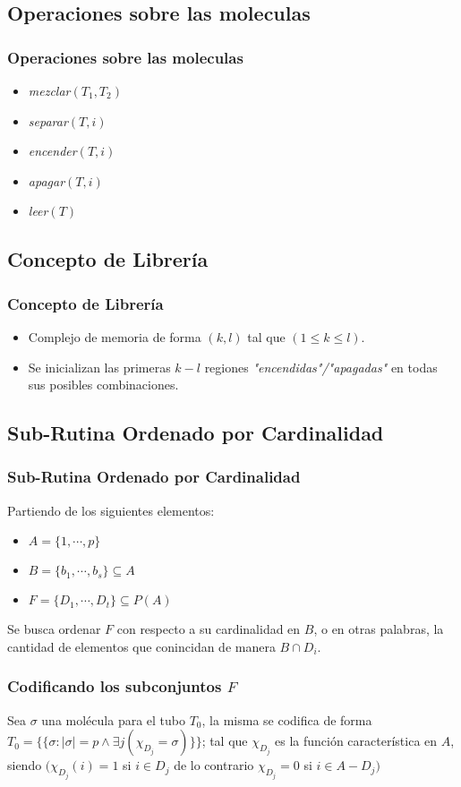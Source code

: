 \documentclass[12pt]{beamer}
\begin{document}
 \begin{frame}
     \subsection{Operaciones sobre las moleculas}
     \frametitle{Operaciones sobre las moleculas}
     \begin{itemize}
        \item \emph{mezclar}$(T_1,T_2)$
        \item \emph{separar}$(T, i)$
        \item \emph{encender}$(T, i)$
        \item \emph{apagar}$(T, i)$
        \item \emph{leer}$(T)$
     \end{itemize}
 \end{frame}
 \begin{frame}
     \subsection{Concepto de Librería}
     \frametitle{Concepto de Librería}
     \begin{itemize}
         \item Complejo de memoria de forma $(k,l)$ tal que  $(1 \leq k \leq l)$.
         \item Se inicializan las primeras $k - l$ regiones \emph{"encendidas"/"apagadas"} en todas sus posibles combinaciones.
     \end{itemize}
 \end{frame}
 \begin{frame}
     \subsection{Sub-Rutina Ordenado por Cardinalidad}
     \frametitle{Sub-Rutina Ordenado por Cardinalidad}
     Partiendo de los siguientes elementos:
     \begin{itemize}
        \item $A = \{1,\cdots,p\}$
        \item $B = \{b_1,\cdots,b_s\} \subseteq A$ 
        \item $F = \{D_1,\cdots,D_t\} \subseteq P(A)$ 
    \end{itemize}
    Se busca ordenar $F$ con respecto a su cardinalidad en $B$, o en otras palabras, la cantidad de elementos que conincidan de manera $B\cap D_i$.
 \end{frame}
 \begin{frame}
     \frametitle{Codificando los subconjuntos $F$}
     Sea $\sigma$ una molécula  para el tubo $T_0$, la misma se codifica de forma $T_0=\{\{\sigma:|\sigma|=p \land \exists j(\chi_{D_j}=\sigma)\}\}$; tal que $\chi_{D_j}$ es la función característica en $A$, siendo $(\chi_{D_j}(i) = 1$ si $i \in D_j$ de lo contrario $\chi_{D_j} = 0$ si $i \in A - D_j)$
 \end{frame}
\end{document}
